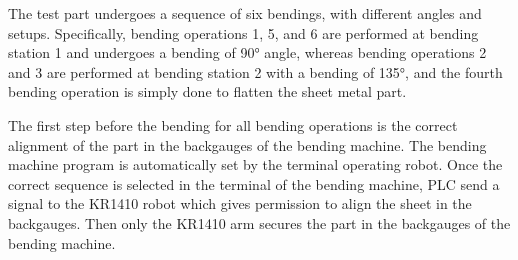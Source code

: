 
The test part undergoes a sequence of six bendings, with different angles and setups. Specifically, bending operations 1, 5, and 6 are performed at bending station 1 and undergoes a bending of 90° angle, whereas bending operations 2 and 3 are performed at bending station 2 with a bending of 135°, and the fourth bending operation is simply done to flatten the sheet metal part.

The first step before the bending for all bending operations is the correct alignment of the part in the backgauges of the bending machine. The bending machine program is automatically set by the terminal operating robot. Once the correct sequence is selected in the terminal of the bending machine, PLC send a signal to the KR1410 robot which gives permission to align the sheet in the backgauges.
Then only the KR1410 arm secures the part in the backgauges of the bending machine.

